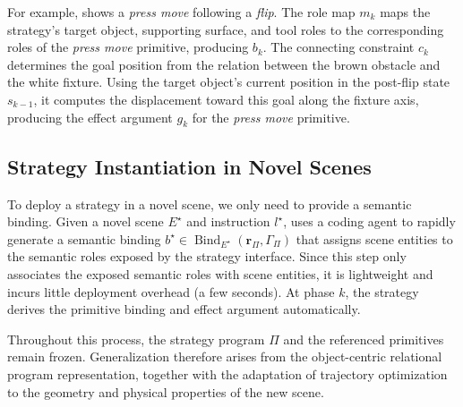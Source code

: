 For example,  shows a \textit{press move} following a \textit{flip}. The role map $m_k$ maps the strategy's target object, supporting surface, and tool roles to the corresponding roles of the \textit{press move} primitive, producing $b_k$. The connecting constraint $c_k$ determines the goal position from the relation between the brown obstacle and the white fixture. Using the target object's current position in the post-flip state $s_{k-1}$, it computes the displacement toward this goal along the fixture axis, producing the effect argument $g_k$ for the \textit{press move} primitive.

\subsection{Strategy Instantiation in Novel Scenes}
\label{sec:novel_instantiation}

To deploy a strategy in a novel scene, we only need to provide a semantic binding. Given a novel scene $E^\star$ and instruction $l^\star$, \ours uses a coding agent to rapidly generate a semantic binding $b^\star \in\operatorname{Bind}_{E^\star}(\mathbf{r}_\Pi,\Gamma_\Pi)$ that assigns scene entities to the semantic roles exposed by the strategy interface. 
Since this step only associates the exposed semantic roles with scene entities, it is lightweight and incurs little deployment overhead (a few seconds). At phase $k$, the strategy derives the primitive binding and effect argument automatically. 

Throughout this process, the strategy program $\Pi$ and the referenced primitives remain frozen. Generalization therefore arises from the object-centric relational program representation, together with the adaptation of trajectory optimization to the geometry and physical properties of the new scene.

